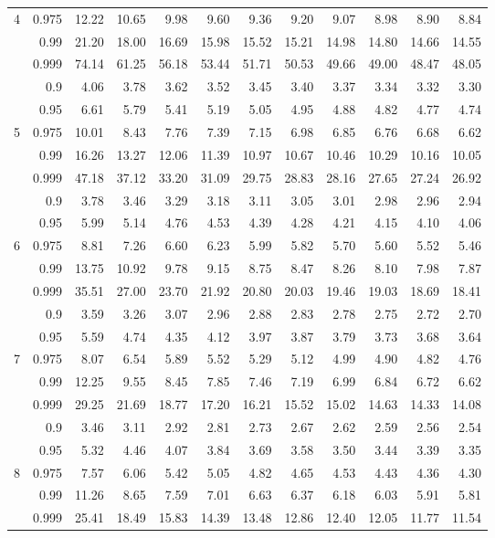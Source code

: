 \documentclass[12pt,a4paper,openany,twoside]{report}
\theoremstyle{definition}
\theoremstyle{remark}
\theoremstyle{plain}
\theoremstyle{definition}
\theoremstyle{definition}
\theoremstyle{definition}
\theoremstyle{remark}
\begin{document}
\begin{center}
\begin{tabular}{rr@{\ }r@{\ }r@{\ }r@{\ }r@{\ }r@{\ }r@{\ }r@{\ }r@{\ }r@{\ }r}
4 & 0.975 & 12.22 & 10.65 & 9.98 & 9.60 & 9.36 & 9.20 & 9.07 & 8.98 & 8.90 & 8.84\\
 & 0.99 & 21.20 & 18.00 & 16.69 & 15.98 & 15.52 & 15.21 & 14.98 & 14.80 & 14.66 & 14.55\\
 & 0.999 & 74.14 & 61.25 & 56.18 & 53.44 & 51.71 & 50.53 & 49.66 & 49.00 & 48.47 & 48.05\\
\rule{0pt}{2.5ex} & 0.9 & 4.06 & 3.78 & 3.62 & 3.52 & 3.45 & 3.40 & 3.37 & 3.34 & 3.32 & 3.30\\
 & 0.95 & 6.61 & 5.79 & 5.41 & 5.19 & 5.05 & 4.95 & 4.88 & 4.82 & 4.77 & 4.74\\
5 & 0.975 & 10.01 & 8.43 & 7.76 & 7.39 & 7.15 & 6.98 & 6.85 & 6.76 & 6.68 & 6.62\\
 & 0.99 & 16.26 & 13.27 & 12.06 & 11.39 & 10.97 & 10.67 & 10.46 & 10.29 & 10.16 & 10.05\\
 & 0.999 & 47.18 & 37.12 & 33.20 & 31.09 & 29.75 & 28.83 & 28.16 & 27.65 & 27.24 & 26.92\\
\rule{0pt}{2.5ex} & 0.9 & 3.78 & 3.46 & 3.29 & 3.18 & 3.11 & 3.05 & 3.01 & 2.98 & 2.96 & 2.94\\
 & 0.95 & 5.99 & 5.14 & 4.76 & 4.53 & 4.39 & 4.28 & 4.21 & 4.15 & 4.10 & 4.06\\
6 & 0.975 & 8.81 & 7.26 & 6.60 & 6.23 & 5.99 & 5.82 & 5.70 & 5.60 & 5.52 & 5.46\\
 & 0.99 & 13.75 & 10.92 & 9.78 & 9.15 & 8.75 & 8.47 & 8.26 & 8.10 & 7.98 & 7.87\\
 & 0.999 & 35.51 & 27.00 & 23.70 & 21.92 & 20.80 & 20.03 & 19.46 & 19.03 & 18.69 & 18.41\\
\rule{0pt}{2.5ex} & 0.9 & 3.59 & 3.26 & 3.07 & 2.96 & 2.88 & 2.83 & 2.78 & 2.75 & 2.72 & 2.70\\
 & 0.95 & 5.59 & 4.74 & 4.35 & 4.12 & 3.97 & 3.87 & 3.79 & 3.73 & 3.68 & 3.64\\
7 & 0.975 & 8.07 & 6.54 & 5.89 & 5.52 & 5.29 & 5.12 & 4.99 & 4.90 & 4.82 & 4.76\\
 & 0.99 & 12.25 & 9.55 & 8.45 & 7.85 & 7.46 & 7.19 & 6.99 & 6.84 & 6.72 & 6.62\\
 & 0.999 & 29.25 & 21.69 & 18.77 & 17.20 & 16.21 & 15.52 & 15.02 & 14.63 & 14.33 & 14.08\\
\rule{0pt}{2.5ex} & 0.9 & 3.46 & 3.11 & 2.92 & 2.81 & 2.73 & 2.67 & 2.62 & 2.59 & 2.56 & 2.54\\
 & 0.95 & 5.32 & 4.46 & 4.07 & 3.84 & 3.69 & 3.58 & 3.50 & 3.44 & 3.39 & 3.35\\
8 & 0.975 & 7.57 & 6.06 & 5.42 & 5.05 & 4.82 & 4.65 & 4.53 & 4.43 & 4.36 & 4.30\\
 & 0.99 & 11.26 & 8.65 & 7.59 & 7.01 & 6.63 & 6.37 & 6.18 & 6.03 & 5.91 & 5.81\\
 & 0.999 & 25.41 & 18.49 & 15.83 & 14.39 & 13.48 & 12.86 & 12.40 & 12.05 & 11.77 & 11.54\\
\end{tabular}
\end{center}
\end{document}
